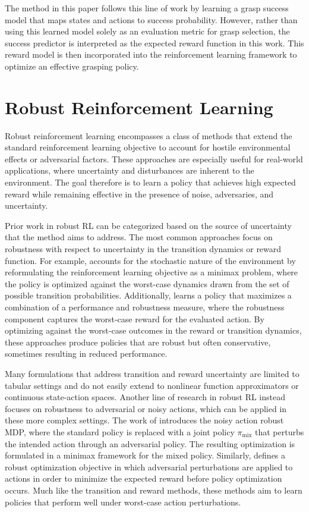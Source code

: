\documentclass[./dissertation.tex]{subfiles}
\begin{document}
The method in this paper follows this line of work by learning a grasp success model that maps states and actions to success probability. However, rather than using this learned model solely as an evaluation metric for grasp selection, the success predictor is interpreted as the expected reward function in this work. This reward model is then incorporated into the reinforcement learning framework to optimize an effective grasping policy.

\section{Robust Reinforcement Learning}
\label{RRL}
Robust reinforcement learning \parencite{RobustRLSurvey} encompasses a class of methods that extend the standard reinforcement learning objective to account for hostile environmental effects or adversarial factors. These approaches are especially useful for real-world applications, where uncertainty and disturbances are inherent to the environment. The goal therefore is to learn a policy that achieves high expected reward while remaining effective in the presence of noise, adversaries, and uncertainty.

Prior work in robust RL can be categorized based on the source of uncertainty that the method aims to address. The most common approaches focus on robustness with respect to uncertainty in the transition dynamics or reward function. For example, \cite{RobustTransition} accounts for the stochastic nature of the environment by reformulating the reinforcement learning objective as a minimax problem, where the policy is optimized against the worst-case dynamics drawn from the set of possible transition probabilities. Additionally, \cite{RobustReward} learns a policy that maximizes a combination of a performance and robustness measure, where the robustness component captures the worst-case reward for the evaluated action. By optimizing against the worst-case outcomes in the reward or transition dynamics, these approaches produce policies that are robust but often conservative, sometimes resulting in reduced performance.

Many formulations that address transition and reward uncertainty are limited to tabular settings and do not easily extend to nonlinear function approximators or continuous state-action spaces. Another line of research in robust RL instead focuses on robustness to adversarial or noisy actions, which can be applied in these more complex settings. The work of \cite{RobustActionMDP} introduces the noisy action robust MDP, where the standard policy is replaced with a joint policy $\pi_\text{mix}$ that perturbs the intended action through an adversarial policy. The resulting optimization is formulated in a minimax framework for the mixed policy. Similarly, \cite{RobustActionDelta} defines a robust optimization objective in which adversarial perturbations are applied to actions in order to minimize the expected reward before policy optimization occurs. Much like the transition and reward methods, these methods aim to learn policies that perform well under worst-case action perturbations.
\end{document}
